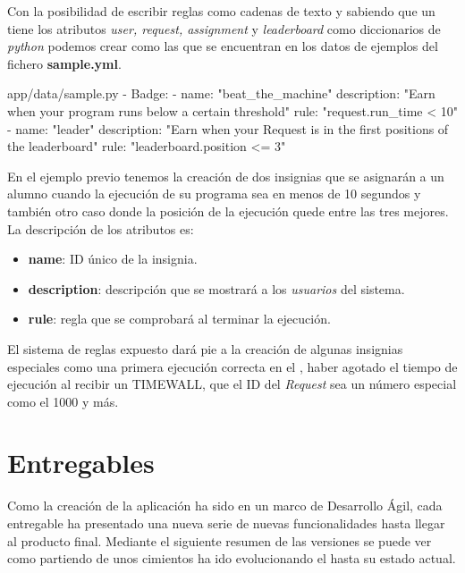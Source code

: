 \documentclass[11pt,spanish,listoffigures,listoftables]{tfgetsinf}
\begin{document}
Con la posibilidad de escribir reglas como cadenas de texto y sabiendo que un  tiene los atributos \textit{user, request, assignment} y \textit{leaderboard} como diccionarios de \textit{python} podemos crear  como las que se encuentran en los datos de ejemplos del fichero \textbf{sample.yml}.

\begin{code}{app/data/sample.py}
- Badge:
	- name: "beat_the_machine"
	description: "Earn when your program runs below a certain threshold"
	rule: "request.run_time < 10"
	- name: "leader"
	description: "Earn when your Request is in the first positions of the leaderboard"
	rule: "leaderboard.position <= 3"
\end{code}

En el ejemplo previo tenemos la creación de dos \gls{insignia}s que se asignarán a un \gls{alumno} cuando la ejecución de su programa sea en menos de 10 segundos y también otro caso donde la posición de la ejecución quede entre las tres mejores. La descripción de los atributos es:

\begin{itemize}
	\item \textbf{name}: ID único de la \gls{insignia}.
	\item \textbf{description}: descripción que se mostrará a los \textit{usuarios} del sistema.
	\item \textbf{rule}: regla que se comprobará al terminar la ejecución.
\end{itemize}

El sistema de reglas expuesto dará pie a la creación de algunas \gls{insignia}s especiales como una primera ejecución correcta en el , haber agotado el tiempo de ejecución al recibir un TIMEWALL, que el ID del \textit{Request} sea un número especial como el 1000 y más.

\section{Entregables}

Como la creación de la aplicación ha sido en un marco de Desarrollo Ágil, cada entregable ha presentado una nueva serie de nuevas funcionalidades hasta llegar al producto final. Mediante el siguiente resumen de las versiones se puede ver como partiendo de unos cimientos ha ido evolucionando el  hasta su estado actual.
\end{document}
